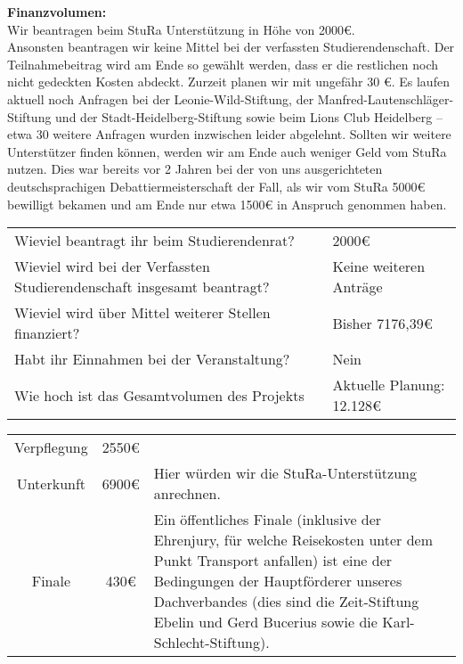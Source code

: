 {    \textbf{Finanzvolumen:}\\
    Wir beantragen beim StuRa Unterstützung in Höhe von 2000€.\\[1em]
    Ansonsten beantragen wir keine Mittel bei der verfassten Studierendenschaft. Der Teilnahmebeitrag wird am Ende so gewählt werden, dass er die restlichen noch nicht gedeckten Kosten abdeckt. Zurzeit planen wir mit ungefähr 30 €. Es laufen aktuell noch Anfragen bei der Leonie-Wild-Stiftung, der Manfred-Lautenschläger-Stiftung und der Stadt-Heidelberg-Stiftung sowie beim Lions Club Heidelberg – etwa 30 weitere Anfragen wurden inzwischen leider abgelehnt. Sollten wir weitere Unterstützer finden können, werden wir am Ende auch weniger Geld vom StuRa nutzen. Dies war bereits vor 2 Jahren bei der von uns ausgerichteten deutschsprachigen Debattiermeisterschaft der Fall, als wir vom StuRa 5000€ bewilligt bekamen und am Ende nur etwa 1500€ in Anspruch genommen haben.\\[1em]
    \begin{tabular}{l l}
        Wieviel beantragt ihr beim Studierendenrat?                             & 2000€                     \\
        Wieviel wird bei der Verfassten Studierendenschaft insgesamt beantragt? & Keine weiteren Anträge    \\
        Wieviel wird über Mittel weiterer Stellen finanziert?                   & Bisher 7176,39€           \\
        Habt ihr Einnahmen bei der Veranstaltung?                               & Nein                      \\
        Wie hoch ist das Gesamtvolumen des Projekts                             & Aktuelle Planung: 12.128€ \\
    \end{tabular}
    \newline
    \vspace*{2em}
    \newline
    \begin{tabular}{c c p{10cm}}
        Verpflegung & 2550€ & \\
        Unterkunft & 6900€ & Hier würden wir die StuRa-Unterstützung anrechnen.\\
        Finale & 430€ & Ein öffentliches Finale (inklusive der Ehrenjury, für welche Reisekosten unter dem Punkt Transport anfallen) ist eine der Bedingungen der Hauptförderer unseres Dachverbandes (dies sind die Zeit-Stiftung Ebelin und Gerd Bucerius sowie die Karl-Schlecht-Stiftung). \\

\end{tabular}}
